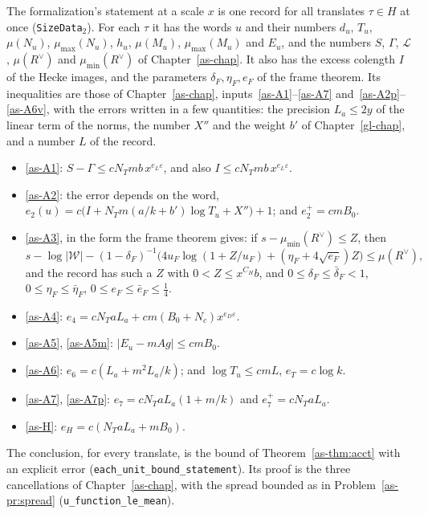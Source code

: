 \documentclass[reqno]{amsart}
\newcounter{chap}
\theoremstyle{definition}
\theoremstyle{plain}
\newcommand{\Lc}{\mathcal{L}}
\newcommand{\Wc}{\mathcal{W}}
\newcommand{\mumax}{\mu_{\max}}
\newcommand{\mumin}{\mu_{\min}}
\newcommand{\tl}[1]{\texttt{#1}}
\begin{document}
The formalization's statement at a scale \(x\) is one record for all translates \(\tau \in H\) at once (\tl{SizeData}\(_2\)).  For each \(\tau\) it has the words \(u\) and their numbers \(d_u\), \(T_u\), \(\mu(N_u)\), \(\mumax(N_u)\), \(h_u\), \(\mu(M_u)\), \(\mumax(M_u)\) and \(E_u\), and the numbers \(S\), \(\Gamma\), \(\Lc\), \(\mu(R^\vee)\) and \(\mumin(R^\vee)\) of Chapter~\ref{as-chap}.  It also has the excess colength \(I\) of the Hecke images, and the parameters \(\delta_F, \eta_F, e_F\) of the frame theorem.  Its inequalities are those of Chapter~\ref{as-chap}, inputs~\eqref{as-A1}--\eqref{as-A7} and~\eqref{as-A2p}--\eqref{as-A6v}, with the errors written in a few quantities: the precision \(L_a \le 2y\) of the linear term of the norms, the number \(X''\) and the weight \(b'\) of Chapter~\ref{gl-chap}, and a number \(L\) of the record.
\begin{itemize}
\item \eqref{as-A1}: \(S - \Gamma \le cN_Tmb\,x^{e_L\varepsilon}\), and also \(I \le cN_Tmb\,x^{e_L\varepsilon}\).
\item \eqref{as-A2}: the error depends on the word, \(e_2(u) = c\bigl(I + N_Tm(a/k + b')\log T_u + X''\bigr) + 1\); and \(e_2^+ = cmB_0\).
\item \eqref{as-A3}, in the form the frame theorem gives: if \(s - \mumin(R^\vee) \le Z\), then
\[
  s - \log\lvert\Wc\rvert - (1 - \delta_F)^{-1}\bigl(4u_F\log(1 + Z/u_F) + (\eta_F + 4\sqrt{e_F})Z\bigr) \le \mu(R^\vee) ,
\]
and the record has such a \(Z\) with \(0 < Z \le x^{C_H}b\), and \(0 \le \delta_F \le \bar\delta_F < 1\), \(0 \le \eta_F \le \bar\eta_F\), \(0 \le e_F \le \bar e_F \le \frac14\).
\item \eqref{as-A4}: \(e_4 = cN_TaL_a + cm(B_0 + N_c)x^{e_D\varepsilon}\).
\item \eqref{as-A5}, \eqref{as-A5m}: \(\lvert E_u - mAg\rvert \le cmB_0\).
\item \eqref{as-A6}: \(e_6 = c(L_a + m^2L_a/k)\); and \(\log T_u \le cmL\), \(e_T = c\log k\).
\item \eqref{as-A7}, \eqref{as-A7p}: \(e_7 = cN_TaL_a(1 + m/k)\) and \(e_7^+ = cN_TaL_a\).
\item \eqref{as-H}: \(e_H = c(N_TaL_a + mB_0)\).
\end{itemize}
The conclusion, for every translate, is the bound of Theorem~\ref{as-thm:acct} with an explicit error (\tl{each\_unit\_bound\_statement}).  Its proof is the three cancellations of Chapter~\ref{as-chap}, with the spread bounded as in Problem~\ref{as-pr:spread} (\tl{u\_function\_le\_mean}).
\end{document}

